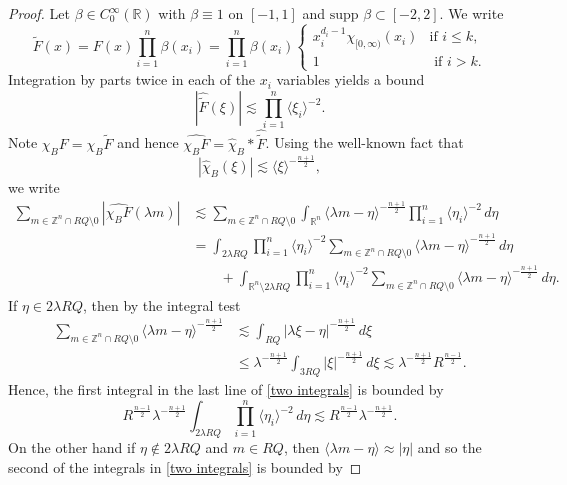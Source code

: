 \documentclass[10pt]{amsart}
\newcommand{\supp}{\text{supp }}
\newcommand{\R}{{\mathbb R}}
\newcommand{\1}{\mathbb{1}}
\newcommand{\Z}{{\mathbb Z}}
\begin{document}
\begin{proof}
Let $\beta \in C_0^\infty(\R)$ with $\beta \equiv 1$ on $[-1,1]$ and $\supp \beta \subset [-2,2]$. We write
\[
    \tilde F(x) = F(x) \prod_{i = 1}^n \beta(x_i) = \prod_{i = 1}^n \beta(x_i) \begin{cases}
        x_i^{d_i - 1} \chi_{[0,\infty)}(x_i) & \text{if $i \leq k$,} \\
        1 & \text{ if $i > k$.}
    \end{cases}
\]
Integration by parts twice in each of the $x_i$ variables yields a bound
\begin{equation} \label{F tilde bound}
    |\widehat{\tilde F}(\xi)| \lesssim \prod_{i=1}^n \langle \xi_i \rangle^{-2}.
\end{equation}
Note $\chi_B F = \chi_B \tilde F$ and hence $\widehat{\chi_B F} = \widehat \chi_B * \widehat{\tilde F}$. Using the well-known fact that
\[
    |\widehat \chi_B(\xi)| \lesssim \langle \xi \rangle^{-\frac{n+1}{2}},
\]
we write
\begin{align}
    \nonumber \sum_{m \in \Z^n \cap R Q \setminus 0} |\widehat{\chi_B F}(\lambda m)| &\lesssim \sum_{m \in \Z^n \cap RQ \setminus 0} \int_{\R^n} \langle \lambda m - \eta\rangle^{-\frac{n+1}{2}} \prod_{i = 1}^n  \langle \eta_i \rangle^{-2} \, d\eta \\
    \nonumber &= \int_{2\lambda R Q} \prod_{i = 1}^n \langle \eta_i \rangle^{-2}  \sum_{m \in \Z^n \cap RQ \setminus 0}  \langle\lambda m - \eta\rangle^{-\frac{n+1}{2}} \, d\eta \\
    \label{two integrals} &\qquad + \int_{\R^n \setminus 2\lambda R Q} \prod_{i = 1}^n \langle \eta_i \rangle^{-2}  \sum_{m \in \Z^n \cap RQ \setminus 0}  \langle \lambda m - \eta\rangle^{-\frac{n+1}{2}} \, d\eta.
\end{align}
If $\eta \in 2\lambda RQ$, then by the integral test
\begin{align*}
    \sum_{m \in \Z^n \cap RQ \setminus 0} \langle \lambda m - \eta \rangle^{-\frac{n+1}{2}} &\lesssim \int_{RQ} |\lambda \xi - \eta|^{-\frac{n+1}{2}} \, d\xi \\
    &\leq \lambda^{-\frac{n+1}{2}}\int_{3RQ} |\xi|^{-\frac{n+1}{2}}\, d\xi \lesssim \lambda^{-\frac{n+1}{2}} R^{\frac{n-1}{2}}.
\end{align*}
Hence, the first integral in the last line of \eqref{two integrals} is bounded by
\[
    R^{\frac{n-1}{2}} \lambda^{-\frac{n+1}{2}} \int_{2\lambda RQ} \prod_{i = 1}^n \langle \eta_i \rangle^{-2} \, d\eta \lesssim  R^{\frac{n-1}{2}} \lambda^{-\frac{n+1}{2}}.
\]
On the other hand if $\eta \not\in 2\lambda R Q$ and $m \in RQ$, then $\langle\lambda m - \eta\rangle \approx |\eta|$ and so the second of the integrals in \eqref{two integrals} is bounded by

\end{proof}
\end{document}
